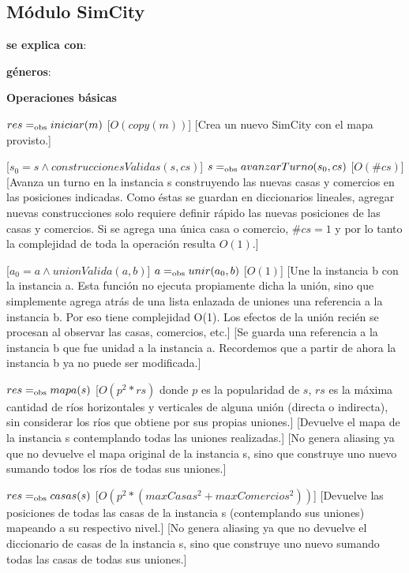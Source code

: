 \subsection{Módulo SimCity}

\begin{Interfaz}

\textbf{se explica con}: 

\textbf{géneros}: 

{\textbf{\large Operaciones básicas}}

{$res =_{\mathrm{obs}} iniciar(m)$}
[$O(copy(m))$]
[Crea un nuevo SimCity con el mapa provisto.]

[$s_0 = s \land construccionesValidas(s, cs)$]
{$s =_{\mathrm{obs}} avanzarTurno(s_0, cs)$}
[$O(\#cs)$]
[Avanza un turno en la instancia s construyendo las nuevas casas y comercios en las posiciones indicadas. Como éstas se guardan en diccionarios lineales, agregar nuevas construcciones solo requiere definir rápido las nuevas posiciones de las casas y comercios. Si se agrega una única casa o comercio, $\#cs = 1$ y por lo tanto la complejidad de toda la operación resulta $O(1)$.]

[$a_0 = a \land unionValida(a, b)$]
{$a =_{\mathrm{obs}} unir(a_0, b)$}
[$O(1)$]
[Une la instancia b con la instancia a. Esta función no ejecuta propiamente dicha la unión, sino que simplemente agrega atrás de una lista enlazada de uniones una referencia a la instancia b. Por eso tiene complejidad O(1). Los efectos de la unión recién se procesan al observar las casas, comercios, etc.]
[Se guarda una referencia a la instancia b que fue unidad a la instancia a. Recordemos que a partir de ahora la instancia b ya no puede ser modificada.]

{$res =_{\mathrm{obs}} mapa(s)$}
[$O(p^2 * rs)$ donde $p$ es la popularidad de $s$, $rs$ es la máxima cantidad de ríos horizontales y verticales de alguna unión (directa o indirecta), sin considerar los ríos que obtiene por sus propias uniones.]
[Devuelve el mapa de la instancia s contemplando todas las uniones realizadas.]
[No genera aliasing ya que no devuelve el mapa original de la instancia s, sino que construye uno nuevo sumando todos los ríos de todas sus uniones.]

{$res =_{\mathrm{obs}} casas(s)$}
[$O(p^2 * (maxCasas^2 + maxComercios^2))$]
[Devuelve las posiciones de todas las casas de la instancia s (contemplando sus uniones) mapeando a su respectivo nivel.]
[No genera aliasing ya que no devuelve el diccionario de casas de la instancia s, sino que construye uno nuevo sumando todas las casas de todas sus uniones.]


\end{Interfaz}

